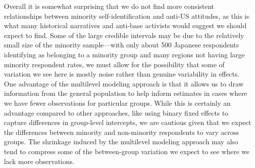 Overall it is somewhat surprising that we do not find more consistent relationships between minority self-identification and anti-US attitudes, as this is what many historical narratives and anti-base activists would suggest we should expect to find. Some of the large credible intervals may be due to the relatively small size of the minority sample---with only about 500 Japanese respondents identifying as belonging to a minority group and many regions not having large minority respondent rates, we must allow for the possibility that some of variation we see here is mostly noise rather than genuine variability in effects. One advantage of the multilevel modeling approach is that it allows us to draw information from the general population to help inform estimates in cases where we have fewer observations for particular groups. While this is certainly an advantage compared to other approaches, like using binary fixed effects to capture differences in group-level intercepts, we are cautious given that we expect the differences between minority and non-minority respondents to vary across groups. The shrinkage induced by the multilevel modeling approach may also tend to compress some of the between-group variation we expect to see where we lack more observations.